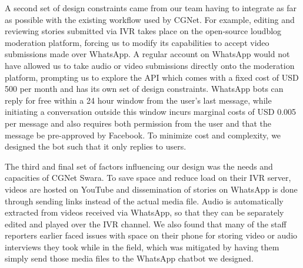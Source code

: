 A second set of design constraints came from our team having to integrate as far as possible with the existing workflow used by CGNet. For example, editing and reviewing stories submitted via IVR takes place on the open-source loudblog moderation platform, forcing us to modify its capabilities to accept video submissions made over WhatsApp. A regular account on WhatsApp would not have allowed us to take audio or video submissions directly onto the moderation platform, prompting us to explore the API which comes with a fixed cost of USD 500 per month and has its own set of design constraints. WhatsApp bots can reply for free within a 24 hour window from the user's last message, while initiating a conversation outside this window incurs marginal costs of USD 0.005 per message and also requires both permission from the user and that the message be pre-approved by Facebook. To minimize cost and complexity, we designed the bot such that it only replies to users.
% 




The third and final set of factors influencing our design was the needs and capacities of CGNet Swara. To save space and reduce load on their IVR server, videos are hosted on YouTube and dissemination of stories on WhatsApp is done through sending links instead of the actual media file. Audio is automatically extracted from videos received via WhatsApp, so that they can be separately edited and played over the IVR channel. We also found that many of the staff reporters earlier faced issues with space on their phone for storing video or audio interviews they took while in the field, which was mitigated by having them simply send those media files to the WhatsApp chatbot we designed.

